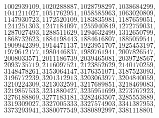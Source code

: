 $ 1002939109, 1020288887, 1028798297, 1038684299, $
$ 1041211027, 1051762951, 1058585963, 1063020809, $
$ 1147930723, 1172520109, 1183835981, 1187659051, $
$ 1241251303, 1247184097, 1255940849, 1272759031, $
$ 1287027493, 1288511629, 1294632499, 1312650799, $
$ 1868732623, 1884198443, 1884616807, 1885059541, $
$ 1909942399, 1914471137, 1923951707, 1925453197, $
$ 1979612177, 1980446837, 1989761941, 2007826547, $
$ 2008033571, 2011186739, 2039465081, 2039728567, $
$ 2093735719, 2116097521, 2123852629, 2140170259, $
$ 3148478261, 3153064147, 3176351071, 3187523093, $
$ 3196772239, 3201312913, 3203063977, 3204840059, $
$ 3210224309, 3213032591, 3217689851, 3218469083, $
$ 3219857533, 3231880427, 3235951699, 3273767923, $
$ 3276188869, 3277183181, 3282463507, 3285553889, $
$ 3319309027, 3327005333, 3327574903, 3341387953, $
$ 3373293941, 3380077549, 3380892997, 3381118801  $

